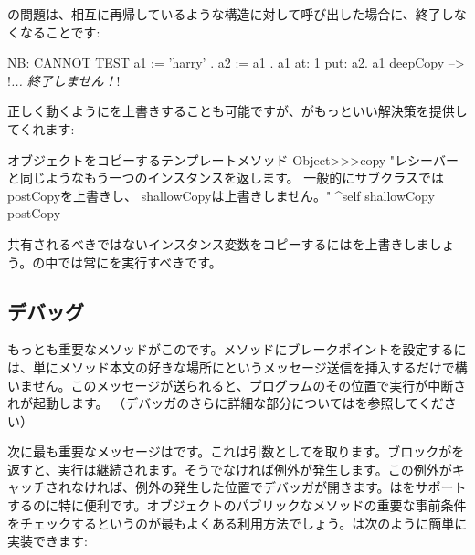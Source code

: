 \documentclass[a4paper,10pt,twoside]{book}
\begin{document}
の問題は、相互に再帰しているような構造に対して呼び出した場合に、終了しなくなることです:

\begin{code}{NB: CANNOT TEST}
a1 := { 'harry' }.
a2 := { a1 }.
a1 at: 1 put: a2.
a1 deepCopy --> !\emph{... 終了しません！}!
\end{code}

正しく動くようにを上書きすることも可能ですが、がもっといい解決策を提供してくれます:

\begin{method}{オブジェクトをコピーするテンプレートメソッド}
Object>>>copy
    "レシーバーと同じようなもう一つのインスタンスを返します。
    一般的にサブクラスではpostCopyを上書きし、
    shallowCopyは上書きしません。"
    ^self shallowCopy postCopy
\end{method}

共有されるべきではないインスタンス変数をコピーするにはを上書きしましょう。の中では常にを実行すべきです。


\subsection{デバッグ}

もっとも重要なメソッドがこのです。メソッドにブレークポイントを設定するには、単にメソッド本文の好きな場所にというメッセージ送信を挿入するだけで構いません。このメッセージが送られると、プログラムのその位置で実行が中断されが起動します。
（デバッガのさらに詳細な部分についてはを参照してください）


次に最も重要なメッセージはです。これは引数としてを取ります。ブロックがを返すと、実行は継続されます。そうでなければ例外が発生します。この例外がキャッチされなければ、例外の発生した位置でデバッガが開きます。はをサポートするのに特に便利です。オブジェクトのパブリックなメソッドの重要な事前条件をチェックするというのが最もよくある利用方法でしょう。は次のように簡単に実装できます:
\end{document}

